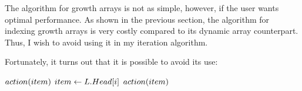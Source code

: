 \HdrGrowthArrayImpl

The algorithm for growth arrays is not as simple, however, if the user wants optimal performance. As shown in the previous section, the algorithm for indexing growth arrays is very costly compared to its dynamic array counterpart. Thus, I wish to avoid using it in my iteration algorithm.

Fortunately, it turns out that it is possible to avoid its use:

\begin{algorithm}
	\begin{algorithmic}
			\For{$\LclItem \TextIn \LclBuffer$}
				\State $action(item)$
			\EndFor
		\EndFor
		\State $item \gets L.Head[i]$
		\State $action(item)$
		\EndFor
	\end{algorithmic}
\end{algorithm}